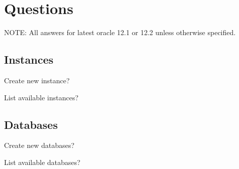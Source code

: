 
\newpage
\section{Questions}

NOTE: All answers for latest oracle 12.1 or 12.2 unless
otherwise specified.

\subsection{Instances}
\begin{itemize*}
     \item{} Create new instance?
     \item{} List available instances?
\end{itemize*}

\subsection{Databases}
\begin{itemize*}
     \item{} Create new databases?
     \item{} List available databases?
\end{itemize*}


